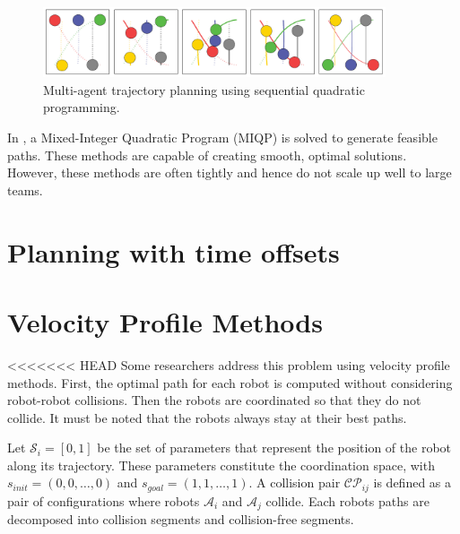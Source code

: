 \begin{figure}
\centering
\includegraphics[width=0.9\textwidth]{./images/dandrea_scp.png}
\caption{Multi-agent trajectory planning using sequential quadratic programming. \cite{augugliaro2012generation}}
\end{figure}

In \cite{mellinger2012mixed}, a Mixed-Integer Quadratic Program (MIQP) is solved to generate feasible paths. These methods are capable of creating smooth, optimal solutions. However, these methods are often tightly and hence do not scale  up well to large teams. 
\section{Planning with time offsets}

\section{Velocity Profile Methods}
<<<<<<< HEAD
Some researchers address this problem using velocity profile methods\cite{peng2005coordinating}. First, the optimal path for each robot is computed without considering robot-robot collisions. Then the robots are coordinated so that they do not collide. It must be noted that the robots always stay at their best paths. 

Let $\mathcal{S}_i=[0,1]$  be the set of parameters that represent the position of the robot along its trajectory. These parameters constitute the coordination space, with $s_{init}=(0,0,\ldots,0)$ and $s_{goal}=(1,1,\ldots,1)$. A collision pair $\mathcal{CP}_{ij}$ is defined as a pair of configurations where robots $\mathcal{A}_i$ and $\mathcal{A}_j$ collide. Each robots paths are decomposed into collision segments and collision-free segments. 

